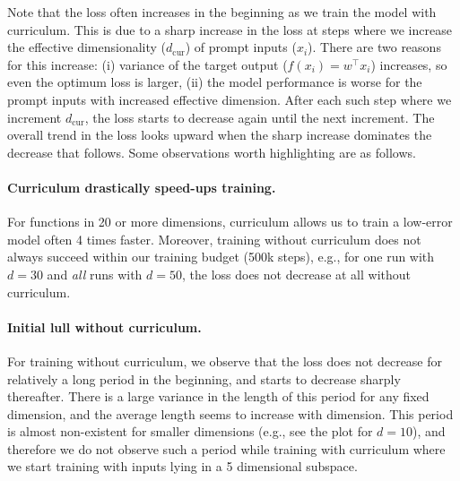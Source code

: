 \documentclass{article}
\begin{document}
Note that the loss often increases in the beginning as we train the model with curriculum. This is due to a sharp increase in the loss at steps where we increase the effective dimensionality ($d_\text{cur}$) of prompt inputs ($x_i$). There are two reasons for this increase: (i) variance of the target output ($f(x_i) = w^\top x_i$) increases, so even the optimum loss is larger, (ii) the model performance is worse for the prompt inputs with increased effective dimension. After each such step where we increment $d_\text{cur}$, the loss starts to decrease again until the next increment. The overall trend in the loss looks upward when the sharp increase dominates the decrease that follows. Some observations worth highlighting are as follows.

\paragraph{Curriculum drastically speed-ups training.} For functions in 20 or more dimensions, curriculum allows us to train a low-error model often 4 times faster. Moreover, training without curriculum does not always succeed within our training budget (500k steps), e.g., for one run with $d=30$  and \emph{all} runs with $d=50$, the loss does not decrease at all without curriculum.

\paragraph{Initial lull without curriculum.}     For training without curriculum, we observe that the loss does not decrease for relatively a long period in the beginning, and starts to decrease sharply thereafter. There is a large variance in the length of this period for any fixed dimension, and  the average length  seems to increase with dimension. This period is almost non-existent for smaller dimensions (e.g., see the plot for $d=10$), and therefore we do not observe such a period while training with curriculum where we start training with inputs lying in a 5 dimensional subspace.
\end{document}
